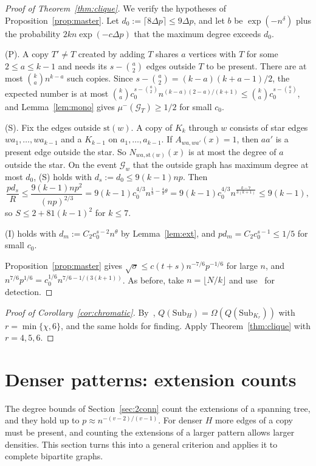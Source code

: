\documentclass[11pt]{article}
\theoremstyle{remark}
\newcommand{\st}{\mathrm{st}}
\newcommand{\Sub}{\mathrm{Sub}}
\newcommand{\Ev}{\mathcal{G}}
\begin{document}
\begin{proof}[Proof of Theorem~\ref{thm:clique}]
We verify the hypotheses of Proposition~\ref{prop:master}. Let $d_0:=\lceil8\Delta p\rceil\le9\Delta p$, and let $b$ be $\exp(-n^\delta)$ plus the probability $2kn\exp(-c\Delta p)$ that the maximum degree exceeds $d_0$.

(P). A copy $T'\ne T$ created by adding $T$ shares $a$ vertices with $T$ for some $2\le a\le k-1$ and needs its $s-\binom a2$ edges outside $T$ to be present. There are at most $\binom kan^{k-a}$ such copies. Since $s-\binom a2=(k-a)(k+a-1)/2$, the expected number is at most $\binom kac_0^{s-\binom a2}n^{(k-a)(2-a)/(k+1)}\le\binom kac_0^{s-\binom a2}$, and Lemma~\ref{lem:mono} gives $\mu^-(\Ev_T)\ge1/2$ for small $c_0$.

(S). Fix the edges outside $\st(w)$. A copy of $K_k$ through $w$ consists of star edges $wa_1,\dots,wa_{k-1}$ and a $K_{k-1}$ on $a_1,\dots,a_{k-1}$. If $A_{wa,wa'}(x)=1$, then $aa'$ is a present edge outside the star. So $N_{wa,\st(w)}(x)$ is at most the degree of $a$ outside the star. On the event $\Ev_w$ that the outside graph has maximum degree at most $d_0$, (S) holds with $d_s:=d_0\le9(k-1)np$. Then
\[\frac{pd_s}R\le\frac{9(k-1)np^2}{(np)^{2/3}}=9(k-1)c_0^{4/3}n^{\frac13-\frac43\theta}=9(k-1)c_0^{4/3}n^{\frac{k-7}{3(k+1)}}\le9(k-1),\]
so $S\le2+81(k-1)^2$ for $k\le7$.

(I) holds with $d_m:=C_2c_0^{s-2}n^\theta$ by Lemma~\ref{lem:ext}, and $pd_m=C_2c_0^{s-1}\le1/5$ for small $c_0$.

Proposition~\ref{prop:master} gives $\sqrt\sigma\le c(t+s)n^{-7/6}p^{-1/6}$ for large $n$, and $n^{7/6}p^{1/6}=c_0^{1/6}n^{7/6-1/(3(k+1))}$. As before, take $n=\lfloor N/k\rfloor$ and use~\cite[Lemma~23]{CGP26} for detection.
\end{proof}

\begin{proof}[Proof of Corollary~\ref{cor:chromatic}]
By~\cite[Theorem~1.3(i)]{GZ26}, $Q(\Sub_H)=\Omega(Q(\Sub_{K_r}))$ with $r=\min\{\chi,6\}$, and the same holds for finding. Apply Theorem~\ref{thm:clique} with $r=4,5,6$.
\end{proof}

\section{Denser patterns: extension counts}\label{sec:ext}

The degree bounds of Section~\ref{sec:2conn} count the extensions of a spanning tree, and they hold up to $p\approx n^{-(v-2)/(v-1)}$. For denser $H$ more edges of a copy must be present, and counting the extensions of a larger pattern allows larger densities. This section turns this into a general criterion and applies it to complete bipartite graphs.
\end{document}
